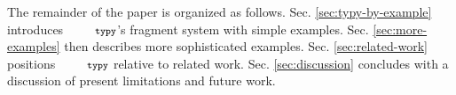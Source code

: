 \documentclass[10pt]{sigplanconf}
\newcommand{\typy}{\texttt{\footnotesize typy}}
\begin{document}
The remainder of the paper is organized as follows. 
Sec. \ref{sec:typy-by-example} introduces $\typy$'s fragment system with simple examples. Sec. \ref{sec:more-examples} then describes more sophisticated examples. %
Sec. \ref{sec:related-work} positions $\typy$ relative to related work.  Sec. \ref{sec:discussion} concludes with a discussion of present limitations and future work.



\end{document}
